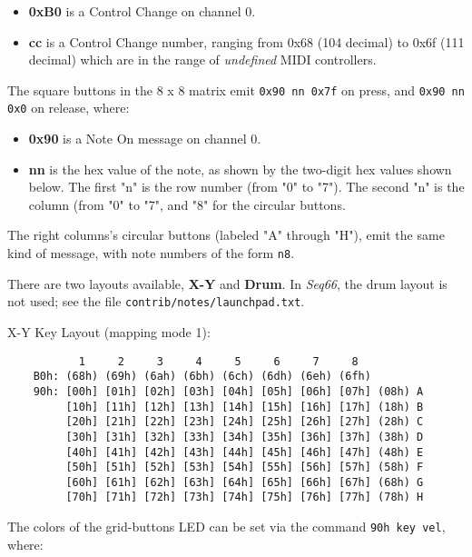    \begin{itemize}
      \item \textbf{0xB0}
         is a Control Change on channel 0.
      \item \textbf{cc}
         is a Control Change number, ranging from 0x68 (104 decimal)
         to 0x6f (111 decimal) which are in the range of
            \textsl{undefined} MIDI controllers.
   \end{itemize}

   The square buttons in the 8 x 8 matrix emit
   \texttt{0x90 nn 0x7f} on press, and \texttt{0x90 nn 0x0} on release, where:

   \begin{itemize}
      \item \textbf{0x90}
         is a Note On message on channel 0.
      \item \textbf{nn}
         is the hex value of the note, as shown by the two-digit hex values
            shown below.  The first "n" is the row number (from "0" to "7").
            The second "n" is the column (from "0" to "7", and "8" for the
            circular buttons.
   \end{itemize}

   The right columns's circular buttons (labeled "A" through "H"),
   emit the same kind of message, with note numbers of the form
   \texttt{n8}.

   There are two layouts available, \textbf{X-Y} and \textbf{Drum}.
   In \textsl{Seq66}, the drum layout is not used; see the
   file \texttt{contrib/notes/launchpad.txt}.

   X-Y Key Layout (mapping mode 1):

   \begin{verbatim}
           1     2     3     4     5     6     7     8 
    B0h: (68h) (69h) (6ah) (6bh) (6ch) (6dh) (6eh) (6fh)
    90h: [00h] [01h] [02h] [03h] [04h] [05h] [06h] [07h] (08h) A
         [10h] [11h] [12h] [13h] [14h] [15h] [16h] [17h] (18h) B
         [20h] [21h] [22h] [23h] [24h] [25h] [26h] [27h] (28h) C
         [30h] [31h] [32h] [33h] [34h] [35h] [36h] [37h] (38h) D
         [40h] [41h] [42h] [43h] [44h] [45h] [46h] [47h] (48h) E
         [50h] [51h] [52h] [53h] [54h] [55h] [56h] [57h] (58h) F
         [60h] [61h] [62h] [63h] [64h] [65h] [66h] [67h] (68h) G
         [70h] [71h] [72h] [73h] [74h] [75h] [76h] [77h] (78h) H
   \end{verbatim}

   The colors of the grid-buttons LED can be set via the command
   \texttt{90h key vel}, where:

